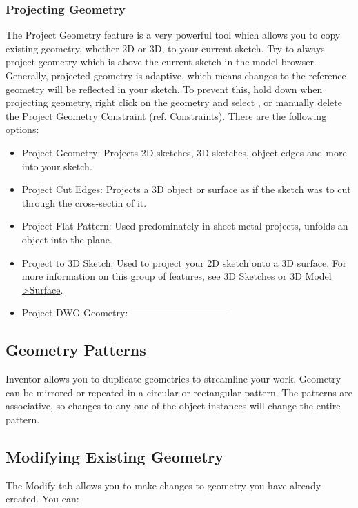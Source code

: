 \subsubsection{Projecting Geometry}
The Project Geometry feature is a very powerful tool which allows you to copy existing geometry, whether 2D or 3D, to your current sketch. Try to always project geometry which is above the current sketch in the model browser. Generally, projected geometry is adaptive, which means changes to the reference geometry will be reflected in your sketch. To prevent this, hold down  when projecting geometry, right click on the geometry and select , or manually delete the Project Geometry Constraint (\hyperref[chap:constraints]{ref. Constraints}). There are the following options:

\begin{itemize}
\item Project Geometry: Projects 2D sketches, 3D sketches, object edges and more into your sketch.
\item Project Cut Edges: Projects a 3D object or surface as if the sketch was to cut through the cross-sectin of it.
\item Project Flat Pattern: Used predominately in sheet metal projects, unfolds an object into the plane.
\item Project to 3D Sketch: Used to project your 2D sketch onto a 3D surface. For more information on this group of features, see \hyperref[section: 3D Sketches]{3D Sketches} or \hyperref[subsection: 3D Model Surface]{3D Model \textgreater Surface}.
\item Project DWG Geometry:  ------------------------------
\end{itemize}

\subsection{Geometry Patterns}
Inventor allows you to duplicate geometries to streamline your work. Geometry can be mirrored or repeated in a circular or rectangular pattern. The patterns are associative, so changes to any one of the object instances will change the entire pattern.

\subsection{Modifying Existing Geometry}
The Modify tab allows you to make changes to geometry you have already created. You can:


